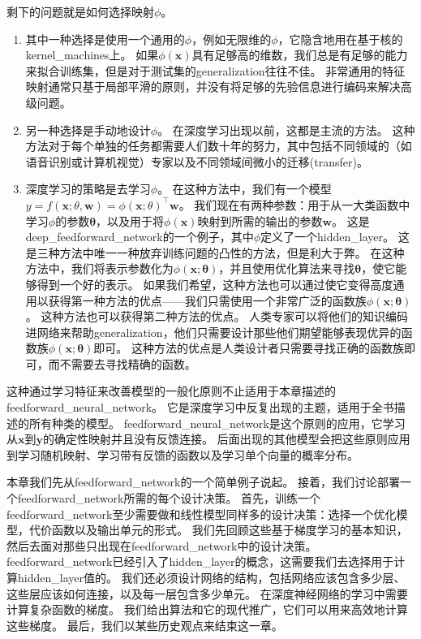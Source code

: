 剩下的问题就是如何选择映射$\phi$。
\begin{enumerate}
\item 其中一种选择是使用一个通用的$\phi$，例如无限维的$\phi$，它隐含地用在基于核的\gls{kernel_machines}上。
如果$\phi(\bm{x})$具有足够高的维数，我们总是有足够的能力来拟合训练集，但是对于测试集的\gls{generalization}往往不佳。
非常通用的特征映射通常只基于局部平滑的原则，并没有将足够的先验信息进行编码来解决高级问题。

\item 另一种选择是手动地设计$\phi$。
在深度学习出现以前，这都是主流的方法。
这种方法对于每个单独的任务都需要人们数十年的努力，其中包括不同领域的（如语音识别或计算机视觉）专家以及不同领域间微小的迁移(transfer)。%

\item 深度学习的策略是去学习$\phi$。
在这种方法中，我们有一个模型$y = f(\bm{x};\theta, \bm{w}) = \phi(\bm{x}; \theta)^\top \bm{w}$。
我们现在有两种参数：用于从一大类函数中学习$\phi$的参数$\bm{\theta}$，以及用于将$\phi(\bm{x})$映射到所需的输出的参数$\bm{w}$。
这是\gls{deep_feedforward_network}的一个例子，其中$\phi$定义了一个\gls{hidden_layer}。
这是三种方法中唯一一种放弃训练问题的凸性的方法，但是利大于弊。
在这种方法中，我们将表示参数化为$\phi(\bm{x}; \bm{\theta})$，并且使用优化算法来寻找$\bm{\theta}$，使它能够得到一个好的表示。
如果我们希望，这种方法也可以通过使它变得高度通用以获得第一种方法的优点——我们只需使用一个非常广泛的函数族$\phi(\bm{x}; \bm{\theta})$。
这种方法也可以获得第二种方法的优点。
人类专家可以将他们的知识编码进网络来帮助\gls{generalization}，他们只需要设计那些他们期望能够表现优异的函数族$\phi(\bm{x}; \bm{\theta})$即可。
这种方法的优点是人类设计者只需要寻找正确的函数族即可，而不需要去寻找精确的函数。
\end{enumerate}

这种通过学习特征来改善模型的一般化原则不止适用于本章描述的\gls{feedforward_neural_network}。
它是深度学习中反复出现的主题，适用于全书描述的所有种类的模型。
\gls{feedforward_neural_network}是这个原则的应用，它学习从$\bm{x}$到$\bm{y}$的确定性映射并且没有反馈连接。
后面出现的其他模型会把这些原则应用到学习随机映射、学习带有反馈的函数以及学习单个向量的概率分布。


本章我们先从\gls{feedforward_network}的一个简单例子说起。
接着，我们讨论部署一个\gls{feedforward_network}所需的每个设计决策。
首先，训练一个\gls{feedforward_network}至少需要做和线性模型同样多的设计决策：选择一个优化模型，代价函数以及输出单元的形式。
我们先回顾这些基于梯度学习的基本知识，然后去面对那些只出现在\gls{feedforward_network}中的设计决策。
\gls{feedforward_network}已经引入了\gls{hidden_layer}的概念，这需要我们去选择用于计算\gls{hidden_layer}值的。
我们还必须设计网络的结构，包括网络应该包含多少层、这些层应该如何连接，以及每一层包含多少单元。
在深度神经网络的学习中需要计算复杂函数的梯度。
我们给出算法和它的现代推广，它们可以用来高效地计算这些梯度。
最后，我们以某些历史观点来结束这一章。

